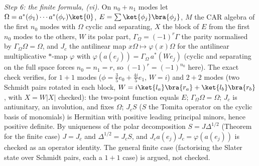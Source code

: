 \emph{Step 6: the finite formula, (vi).} On $n_{0} + n_{1}$ modes let $\Omega = a^{*}(\phi_{1})\cdots a^{*}(\phi_{r})\ket{0}$, $E = \sum\ket{\phi_{j}}\bra{\phi_{j}}$, $M$ the CAR algebra of the first $n_{0}$ modes with $\Omega$ cyclic and separating, $X$ the block of $E$ from the first $n_{0}$ modes to the others, $W$ its polar part, $\Gamma_{\Omega} = (-1)^{r}\Gamma$ the parity normalised by $\Gamma_{\Omega}\Omega = \Omega$, and $J_{c}$ the antilinear map $x\Omega \mapsto \varphi(x)\Omega$ for the antilinear multiplicative $*$-map $\varphi$ with $\varphi(a(e_{j})) = \Gamma_{\Omega}\,a^{*}(We_{j})$ (cyclic and separating on the full space forces $n_{0} = n_{1} = r$, so $(-1)^{r} = (-1)^{n_{0}}$ here). The exact check verifies, for $1 + 1$ modes ($\phi = \tfrac35e_{0} + \tfrac{4i}{5}e_{1}$, $W = i$) and $2 + 2$ modes (two Schmidt pairs rotated in each block, $W = i\ket{l_{a}}\bra{r_{a}} + \ket{l_{b}}\bra{r_{b}}$, with $X = W|X|$ checked): the two-point function equals $E$; $\Gamma_{\Omega}\Omega = \Omega$; $J_{c}$ is antiunitary, an involution, and fixes $\Omega$; $J_{c}S$ ($S$ the Tomita operator on the cyclic basis of monomials) is Hermitian with positive leading principal minors, hence positive definite. By uniqueness of the polar decomposition $S = J\Delta^{1/2}$ (Theorem  for the finite case) $J = J_{c}$ and $\Delta^{1/2} = J_{c}S$, and $J_{c}a(e_{j})J_{c} = \varphi(a(e_{j}))$ is checked as an operator identity. The general finite case (factorising the Slater state over Schmidt pairs, each a $1 + 1$ case) is argued, not checked.
